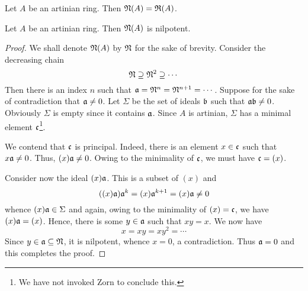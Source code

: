 \begin{corollary}
    Let $A$ be an artinian ring. Then $\mathfrak N(A) = \mathfrak R(A)$.
\end{corollary}

\begin{lemma}
    Let $A$ be an artinian ring. Then $\mathfrak N(A)$ is nilpotent.
\end{lemma}
\begin{proof}
    We shall denote $\mathfrak N(A)$ by $\mathfrak N$ for the sake of brevity. Consider the decreasing chain 
    \begin{equation*}
        \mathfrak N\supseteq\mathfrak N^2\supseteq\cdots
    \end{equation*}
    Then there is an index $n$ such that $\mathfrak a = \mathfrak N^n = \mathfrak N^{n + 1} = \cdots$. Suppose for the sake of contradiction that $\mathfrak a\ne 0$. Let $\Sigma$ be the set of ideals $\mathfrak b$ such that $\mathfrak a\mathfrak b\ne 0$. Obviously $\Sigma$ is empty since it contains $\mathfrak a$. Since $A$ is artinian, $\Sigma$ has a minimal element $\mathfrak c$\footnote{We have not invoked Zorn to conclude this.}. 

    We contend that $\mathfrak c$ is principal. Indeed, there is an element $x\in\mathfrak c$ such that $x\mathfrak a\ne 0$. Thus, $(x)\mathfrak a\ne 0$. Owing to the minimality of $\mathfrak c$, we must have $\mathfrak c = (x)$. 

    Consider now the ideal $(x)\mathfrak a$. This is a subset of $(x)$ and 
    \begin{equation*}
        ((x)\mathfrak a)\mathfrak a^k = (x)\mathfrak a^{k + 1} = (x)\mathfrak a\ne0
    \end{equation*}
    whence $(x)\mathfrak a\in\Sigma$ and again, owing to the minimality of $(x) = \mathfrak c$, we have $(x)\mathfrak a = (x)$. Hence, there is some $y\in\mathfrak a$ such that $xy = x$. We now have 
    \begin{equation*}
        x = xy = xy^2 = \cdots
    \end{equation*}
    Since $y\in\mathfrak a\subseteq\mathfrak N$, it is nilpotent, whence $x = 0$, a contradiction. Thus $\mathfrak a = 0$ and this completes the proof.
\end{proof}


